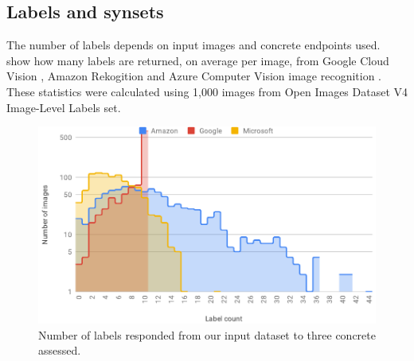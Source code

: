 \subsection{Labels and synsets}\label{icwe2019:sec:label-synsets}

The number of labels depends on input images and concrete  endpoints used.
 show how many labels are returned, on average per image, from Google Cloud Vision , Amazon Rekogition  and Azure Computer Vision  image recognition . These statistics were calculated using 1,000 images from Open Images Dataset V4  Image-Level Labels set.

\begin{table}
\caption[Statistics for the number of labels]{Statistics for the number of labels, on average, per service identified.}\label{icwe2019:tab:label-count}
\centering
{}
\end{table}

\begin{figure}
\centering\includegraphics[width=.9\linewidth]{label_count1}
\caption[Label counts per API assessed]{Number of labels responded from our input dataset to three concrete  assessed.}
\label{icwe2019:fig:label-count1}
\end{figure}

